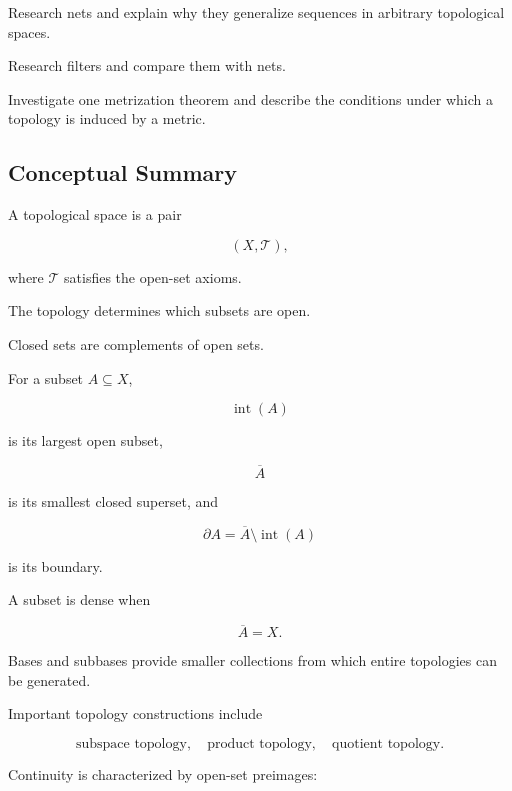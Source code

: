 \begin{exercise}[4]
Research nets and explain why they generalize sequences in arbitrary
topological spaces.
\end{exercise}

\begin{exercise}[4]
Research filters and compare them with nets.
\end{exercise}

\begin{exercise}[4]
Investigate one metrization theorem and describe the conditions under which
a topology is induced by a metric.
\end{exercise}

\subsection{Conceptual Summary}
\label{subsec:point-set-topology-summary}

A topological space is a pair

\[
\boxed{
(X,\mathcal{T}),
}
\]

where \(\mathcal{T}\) satisfies the open-set axioms.

The topology determines which subsets are open.

Closed sets are complements of open sets.

For a subset \(A\subseteq X\),

\[
\boxed{
\operatorname{int}(A)
}
\]

is its largest open subset,

\[
\boxed{
\overline{A}
}
\]

is its smallest closed superset, and

\[
\boxed{
\partial A
=
\overline{A}
\setminus
\operatorname{int}(A)
}
\]

is its boundary.

A subset is dense when

\[
\boxed{
\overline{A}=X.
}
\]

Bases and subbases provide smaller collections from which entire topologies
can be generated.

Important topology constructions include

\[
\boxed{
\text{subspace topology},
\quad
\text{product topology},
\quad
\text{quotient topology}.
}
\]

Continuity is characterized by open-set preimages:

